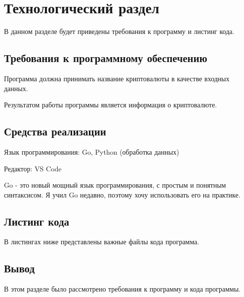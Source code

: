 \chapter{Технологический раздел}
\label{cha:impl}

В данном разделе будет приведены требования к программу и листинг кода.

\section{Требования к программному обеспечению}

Программа должна принимать название криптовалюты в качестве входных данных.

Результатом работы программы является информация о криптовалюте.


\section{Средства реализации}

Язык программирования: Go, Python (обработка данных)

Редактор: VS Code

Go - это новый мощный язык программирования, с простым и понятным синтаксисом.
Я учил Go недавно, поэтому хочу использовать его на практике.



\section{Листинг кода}

В листингах ниже представлены важные файлы кода программа.





\section{Вывод}

В этом разделе было рассмотрено требования к программу и кода программы.